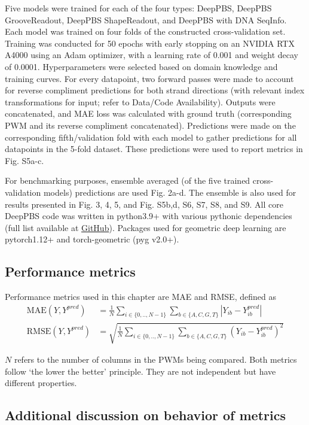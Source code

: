 Five models were trained for each of the four types: DeepPBS, DeepPBS GrooveReadout, DeepPBS ShapeReadout, and DeepPBS with DNA SeqInfo. Each model was trained on four folds of the constructed cross-validation set. Training was conducted for 50 epochs with early stopping on an NVIDIA RTX A4000 using an Adam \citep{Kingma2017} optimizer, with a learning rate of 0.001 and weight decay of 0.0001. Hyperparameters were selected based on domain knowledge and training curves. For every datapoint, two forward passes were made to account for reverse compliment predictions for both strand directions (with relevant index transformations for input; refer to Data/Code Availability). Outputs were concatenated, and MAE loss was calculated with ground truth (corresponding PWM and its reverse compliment concatenated). Predictions were made on the corresponding fifth/validation fold with each model to gather predictions for all datapoints in the 5-fold dataset. These predictions were used to report metrics in Fig. S5a-c. 

For benchmarking purposes, ensemble averaged (of the five trained cross-validation models) predictions are used Fig. 2a-d. The ensemble is also used for results presented in Fig. 3, 4, 5, and Fig. S5b,d, S6, S7, S8, and S9. All core DeepPBS code was written in python3.9+ with various pythonic dependencies (full list available at \href{https://github.com/timkartar/DeepPBS}{GitHub}). Packages used for geometric deep learning are pytorch1.12+ and torch-geometric (pyg v2.0+).

\subsection{Performance metrics}

Performance metrics used in this chapter are MAE and RMSE, defined as 
\begin{align*}
\text{MAE}(Y, Y^{pred}) &= \frac{1}{N} 
\sum\limits_{i\in\{0,..,N-1\}} \sum\limits_{b\in\{A,C,G,T\}} |Y_{ib} - Y_{ib}^{pred}|\\
\text{RMSE}(Y, Y^{pred}) &= \sqrt{\frac{1}{N} \sum\limits_{i\in\{0,..,N-1\}} \sum\limits_{b\in\{A,C,G,T\}} (Y_{ib} - Y_{ib}^{pred})^2}
\end{align*}

$N$ refers to the number of columns in the PWMs being compared. Both metrics follow ‘the lower the better’ principle. They are not independent but have different properties. 

\subsection{Additional discussion on behavior of metrics}

